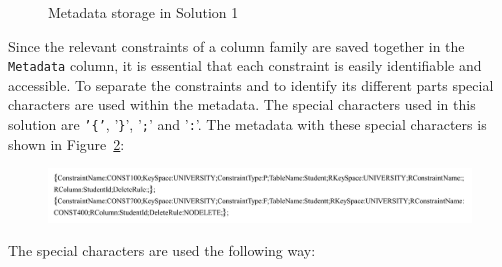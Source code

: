 		\begin{figure}[h] \label{fd:Metadata-Solution1}
			\centering
			\caption{Metadata storage in Solution 1}
		\end{figure}
		
Since the relevant constraints of a column family are saved
together in the \texttt{Metadata} column,  it is essential that each constraint
is easily identifiable and accessible.  To separate
the constraints and to identify its different parts special characters are used within the
metadata.  The special characters used in this solution are \texttt{'\{'}, 
'\texttt{\}}', '\texttt{;}' and '\texttt{:}'. 
The metadata with these special characters is shown in
Figure~\ref{fd:Metadata-Solution1-String}:

		\begin{figure}[H]
			\centering
			\includegraphics[width=.8\textwidth]{./figure/Solutions/Solution1-MD-String.png}
			\label{fd:Metadata-Solution1-String}
		\end{figure}
The special characters are used the following way:
	
